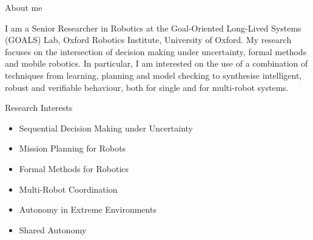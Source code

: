 
\begin{rSection}{About me}

I am a Senior Researcher in Robotics at the  Goal-Oriented Long-Lived Systems (GOALS) Lab, Oxford Robotics Institute, University of Oxford.
%
My research focuses on the intersection of decision making under uncertainty, formal methods and mobile robotics.
%
In particular, I am interested on the use of a combination of techniques from learning, planning and model checking to synthesise intelligent, robust and verifiable behaviour, both  for single and for multi-robot systems.


\begin{rSubsection}{	}{}{}{}
\item Research Interests
\begin{itemize}
\item Sequential Decision Making under Uncertainty
\item Mission Planning for Robots
\item Formal Methods for Robotics
\item Multi-Robot Coordination
\item Autonomy in Extreme Environments
\item Shared Autonomy
\end{itemize}
\end{rSubsection}





\end{rSection}
